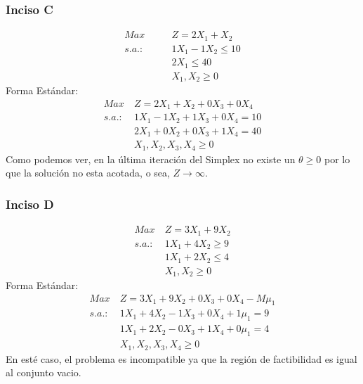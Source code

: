 \documentclass{tarea}
\begin{document}
\begin{homeworkProblem}
\subsubsection{Inciso C}
\begin{align*}
	Max\ &Z = 2X_1 + X_2 \\
	s.a.:\quad\quad &1X_1 - 1X_2 \le 10 \\
	&2X_1 \le 40 \\
	&X_1,X_2 \ge 0
\end{align*}
Forma Estándar:
\begin{align*}
	Max\ &Z = 2X_1 + X_2 + 0X_3 + 0X_4 \\
	s.a.: &1X_1 - 1X_2 + 1X_3 + 0X_4 = 10 \\
	&2X_1 + 0X_2 + 0X_3 + 1X_4 = 40 \\
	&X_1,X_2,X_3,X_4 \ge 0
\end{align*}
Como podemos ver, en la última iteración del Simplex no existe un $\theta \ge 0$ por lo que la solución no esta acotada, o sea, $Z\rightarrow  \infty$.

\subsubsection{Inciso D}
\begin{align*}
	Max\ &Z = 3X_1 + 9X_2 \\
	s.a.: &1X_1 + 4X_2 \ge 9 \\
	&1X_1 + 2X_2 \le 4 \\
	&X_1,X_2 \ge 0 
\end{align*}
Forma Estándar:
\begin{align*}
	Max\ &Z = 3X_1 + 9X_2 + 0X_3 + 0X_4 - M\mu_1 \\
	s.a.: &1X_1 + 4X_2 - 1X_3 + 0X_4 + 1\mu_1 = 9 \\
	&1X_1 + 2X_2 - 0X_3 + 1X_4 + 0\mu_1 = 4 \\
	&X_1,X_2,X_3,X_4 \ge 0
\end{align*}
En esté caso, el problema es incompatible ya que la región de factibilidad es igual al conjunto vacio.
\end{homeworkProblem}
\end{document}
